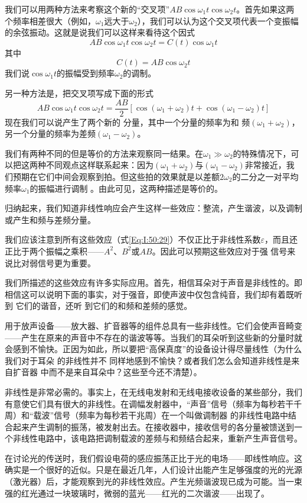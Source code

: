 我们可以用两种方法来考察这个新的“交叉项”$AB \cos\omega_1 t \cos\omega_2 t$。首先如果这两个频率相差很大（例如，$\omega_1$远大于$\omega_2$），我们可以认为这个交叉项代表一个变振幅的余弦振动。这就是说我们可以这样来看待这个因式
\begin{equation}
    \label{Eq:I:50:30}
    AB \cos\omega_1 t \cos\omega_2 t = C(t)\cos\omega_1 t
\end{equation}
其中
\begin{equation}
    \label{Eq:I:50:31}
    C(t) = AB\cos\omega_2 t
\end{equation}
我们说$\cos\omega_1 t$的振幅受到频率$\omega_2$的调制。

另一种方法是，把交叉项写成下面的形式
\begin{equation}
    \label{Eq:I:50:32}
    AB\cos\omega_1t\cos\omega_2t=\frac{AB}{2}\left[\cos(\omega_1+\omega_2)t+\cos(\omega_1-\omega_2)t\right]
\end{equation}
现在我们可以说产生了两个新的 分量，其中一个分量的频率为和 频$(\omega_1 +\omega_2)$，另一个分量的频率为差频$(\omega_1 -\omega_2)$。

我们有两种不同的但是等价的方法来观察同一结果。在$\omega_1 \gg \omega_2$的特殊情况下，可以把这两种不同观点这样联系起来：因为$(\omega_1 +\omega_2)$与$(\omega_1 -\omega_2)$非常接近，我们预期在它们中间会观察到拍。但这些拍的效果就是以差额$2\omega_2$的二分之一对平均频率$\omega_1$的振幅进行调制 。由此可见，这两种描述是等价的。

归纳起来，我们知道非线性响应会产生这样一些效应：整流，产生谐波，以及调制或产生和频与差频分量。

我们应该注意到所有这些效应（式\ref{Eq:I:50:29}）不仅正比于非线性系数$\varepsilon$，而且还正比于两个振幅之乘积——$A^2$、$B^2$或$AB$。因此可以预期这些效应对于强 信号来说比对弱信号更为重要。

我们所描述的这些效应有许多实际应用。首先，相信耳朵对于声音是非线性的。即相信这可以说明下面的事实，对于强音，即使声波中仅包含纯音，我们却有着既听到 它们的谐音，还听 到它们的和频和差频的感觉。

用于放声设备——放大器、扩音器等的组件总具有一些非线性。它们会使声音畸变——产生在原来的声音中不存在的谐波等等。当我们的耳朵听到这些新的分量时就会感到不愉快。正因为如此，所以要把“高保真度”的设备设计得尽量线性（为什么我们对于耳朵 的非线性并不 同样地感到不愉快？或者我们怎么会知道非线性是来自扩音器 中而不是来自耳朵中？这些至今还不清楚）。

非线性是非常必需的。事实上，在无线电发射和无线电接收设备的某些部分，我们有意使它们具有很大的非线性。在调幅发射器中，“声音”信号（频率为每秒若干千周）和“载波”信号（频率为每秒若干兆周）在一个叫做调制器 的非线性电路中结合起来产生调制的振荡，被发射出去。在接收器中，接收信号的各分量被馈送到一个非线性电路中，该电路把调制载波的差频与和频结合起来，重新产生声音信号。

在讨论光的传送时，我们假设电荷的感应振荡正比于光的电场——即线性响应。这确实是一个很好的近似。只是在最近几年，人们设计出能产生足够强度的光的光源（激光器）后，才能观察到光的非线性效应。产生光频谐波现已成为可能。当一束强的红光通过一块玻璃时，微弱的蓝光——红光的二次谐波——出现了。
